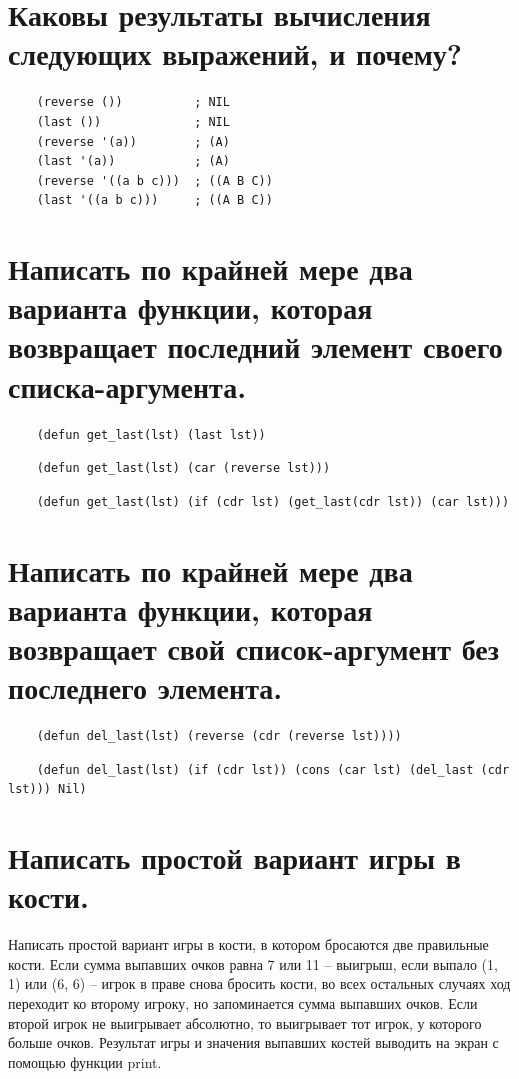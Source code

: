 \documentclass[12pt]{report}
\begin{document}
\section{Каковы результаты вычисления следующих выражений, и почему?}

\begin{lstlisting}
	(reverse ())          ; NIL
	(last ())             ; NIL
	(reverse '(a))        ; (A)
	(last '(a))           ; (A)
	(reverse '((a b c)))  ; ((A B C))
	(last '((a b c)))     ; ((A B C))
\end{lstlisting}

\section{Написать по крайней мере два варианта функции, которая возвращает последний элемент своего списка-аргумента.}

\begin{lstlisting}
	(defun get_last(lst) (last lst))
\end{lstlisting}

\begin{lstlisting}
	(defun get_last(lst) (car (reverse lst)))
\end{lstlisting}

\begin{lstlisting}
	(defun get_last(lst) (if (cdr lst) (get_last(cdr lst)) (car lst)))
\end{lstlisting}

\section{Написать по крайней мере два варианта функции, которая возвращает свой список-аргумент без последнего элемента.}

\begin{lstlisting}
	(defun del_last(lst) (reverse (cdr (reverse lst))))
\end{lstlisting}

\begin{lstlisting}
	(defun del_last(lst) (if (cdr lst)) (cons (car lst) (del_last (cdr lst))) Nil)
\end{lstlisting}

\section{Написать простой вариант игры в кости.}

Написать простой вариант игры в кости, в котором бросаются две правильные кости. Если сумма выпавших очков равна 7 или 11 -- выигрыш, если выпало (1, 1) или (6, 6) -- игрок в праве снова бросить кости, во всех остальных случаях ход переходит ко второму игроку, но запоминается сумма выпавших очков. Если второй игрок не выигрывает абсолютно, то выигрывает тот игрок, у которого больше очков. Результат игры и значения выпавших костей выводить на экран с помощью функции print.
\end{document}
